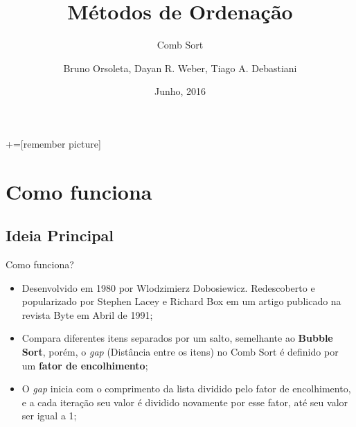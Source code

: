 \documentclass[aspectratio=169,table]{beamer}
\title{Métodos de Ordenação}
\subtitle{Comb Sort}
\author[Bruno Dall Orsoletta, Dayan R. Weber, Tiago A. Debastiani]{Bruno Orsoleta, Dayan R. Weber, Tiago A. Debastiani}
\institute[UFFS -- \textit{Campus} Chapecó] %
{%
  Estrutura de Dados I\\%
  Ciência da Computação\\%
  Universidade Federal da Fronteira Sul\\%
  \textit{Campus} Chapecó%
}
\date{Junho, 2016}
\begin{document}
+=[remember picture]

\everymath{\displaystyle}


\begin{frame}[label=titlepage]
  \titlepage
\end{frame}


\section{Como funciona}
	\subsection{Ideia Principal}
		\begin{frame}{Como funciona?}
			\begin{itemize}
				\item Desenvolvido em 1980 por Wlodzimierz Dobosiewicz. Redescoberto e popularizado por Stephen Lacey e Richard Box em um artigo publicado na revista Byte em Abril de 1991;
				\item Compara diferentes itens separados por um salto, semelhante ao \textbf{Bubble Sort}, porém, o \textit{gap} (Distância entre os itens) no Comb Sort é definido por um \textbf{fator de encolhimento};
				\item O \textit{gap} inicia com o comprimento da lista dividido pelo fator de encolhimento, e a cada iteração seu valor é dividido novamente por esse fator, até seu valor ser igual a 1;
			\end{itemize}
		\end{frame}
\end{document}
